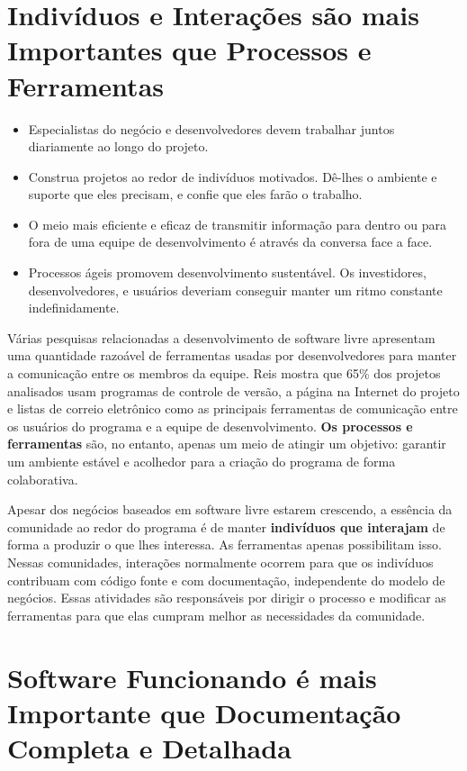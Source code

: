 \section{Indivíduos e Interações são mais Importantes que Processos e
  Ferramentas}
\label{sec:first-princ}

\begin{itemize}
\item Especialistas do negócio e desenvolvedores devem trabalhar
  juntos diariamente ao longo do projeto.
\item Construa projetos ao redor de indivíduos motivados. Dê-lhes o
  ambiente e suporte que eles precisam, e confie que eles farão o
  trabalho.
\item O meio mais eficiente e eficaz de transmitir informação para
  dentro ou para fora de uma equipe de desenvolvimento é através da
  conversa face a face.
\item Processos ágeis promovem desenvolvimento sustentável. Os
  investidores, desenvolvedores, e usuários deveriam conseguir manter
  um ritmo constante indefinidamente.
\end{itemize}

Várias pesquisas relacionadas a desenvolvimento de software livre
apresentam uma quantidade razoável de ferramentas usadas por
desenvolvedores para manter a comunicação entre os membros da
equipe. Reis \cite{Reis2003} mostra que 65\% dos projetos analisados
usam programas de controle de versão, a página na Internet do projeto
e listas de correio eletrônico como as principais ferramentas de
comunicação entre os usuários do programa e a equipe de
desenvolvimento. \textbf{Os processos e ferramentas} são, no entanto,
apenas um meio de atingir um objetivo: garantir um ambiente estável e
acolhedor para a criação do programa de forma colaborativa.

Apesar dos negócios baseados em software livre estarem crescendo, a
essência da comunidade ao redor do programa é de manter
\textbf{indivíduos que interajam} de forma a produzir o que lhes
interessa. As ferramentas apenas possibilitam isso. Nessas
comunidades, interações normalmente ocorrem para que os indivíduos
contribuam com código fonte e com documentação, independente do modelo
de negócios. Essas atividades são responsáveis por dirigir o processo
e modificar as ferramentas para que elas cumpram melhor as
necessidades da comunidade.

\section{Software Funcionando é mais Importante que Documentação
  Completa e Detalhada}
\label{sec:second-princ}


